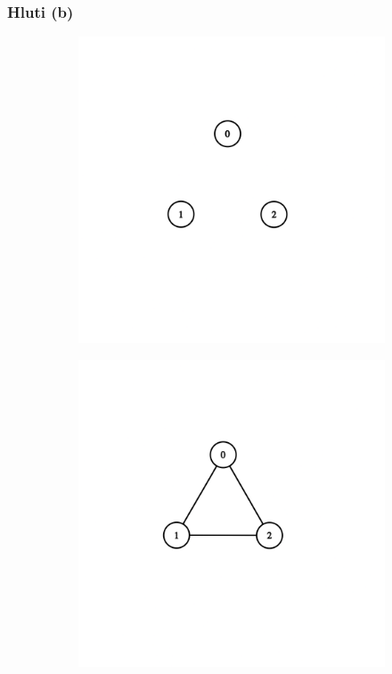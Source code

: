 \documentclass[12pt, a4paper, hidelinks]{article}
\begin{document}
\subsubsection*{Hluti (b)}
\begin{figure}[H]
    \centering
    \begin{subfigure}[b]{0.45\textwidth}
        \includegraphics[width=\textwidth]{graph_v3_1.png}
    \end{subfigure}
    \begin{subfigure}[b]{0.45\textwidth}
        \includegraphics[width=\textwidth]{graph_v3_2.png}
    \end{subfigure}
\end{figure}
\end{document}
